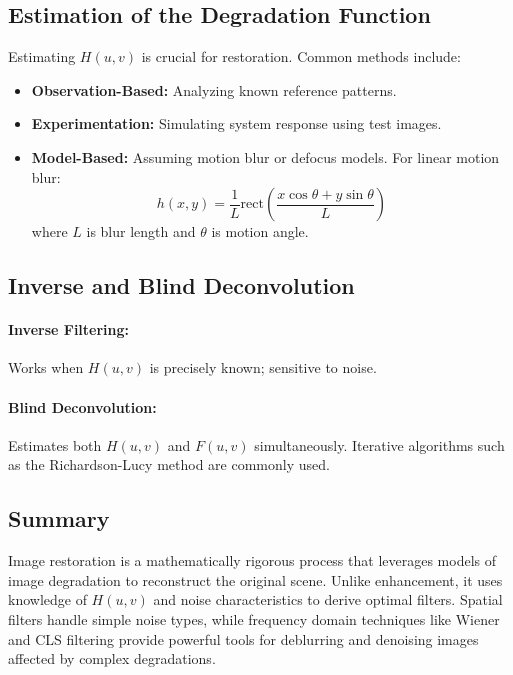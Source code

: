 \documentclass[12pt,a4paper]{AnantDocumentation}
\begin{document}
\subsection{Estimation of the Degradation Function}
Estimating $H(u,v)$ is crucial for restoration. Common methods include:
\begin{itemize}
\item \textbf{Observation-Based:} Analyzing known reference patterns.
\item \textbf{Experimentation:} Simulating system response using test images.
\item \textbf{Model-Based:} Assuming motion blur or defocus models. For linear motion blur:
\begin{equation}
h(x,y) = \frac{1}{L} \text{rect}\left(\frac{x\cos\theta + y\sin\theta}{L}\right)
\end{equation}
where $L$ is blur length and $\theta$ is motion angle.
\end{itemize}

\subsection{Inverse and Blind Deconvolution}
\paragraph{Inverse Filtering:} Works when $H(u,v)$ is precisely known; sensitive to noise.
\paragraph{Blind Deconvolution:} Estimates both $H(u,v)$ and $F(u,v)$ simultaneously. Iterative algorithms such as the Richardson-Lucy method are commonly used.

\subsection{Summary}
Image restoration is a mathematically rigorous process that leverages models of image degradation to reconstruct the original scene. Unlike enhancement, it uses knowledge of $H(u,v)$ and noise characteristics to derive optimal filters. Spatial filters handle simple noise types, while frequency domain techniques like Wiener and CLS filtering provide powerful tools for deblurring and denoising images affected by complex degradations.
\end{document}
